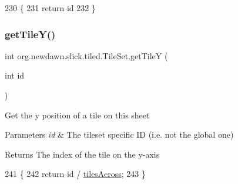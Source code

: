 \begin{DoxyCode}
230                                 \{
231         \textcolor{keywordflow}{return} \textcolor{keywordtype}{id} %
232     \}
\end{DoxyCode}
\mbox{\label{classorg_1_1newdawn_1_1slick_1_1tiled_1_1_tile_set_a09f389ff1e632d4d0d2d1424400aaeaa}} 
\subsubsection{\texorpdfstring{get\+Tile\+Y()}{getTileY()}}
{\footnotesize\ttfamily int org.\+newdawn.\+slick.\+tiled.\+Tile\+Set.\+get\+TileY (\begin{DoxyParamCaption}\item[{int}]{id }\end{DoxyParamCaption})\hspace{0.3cm}{\ttfamily [inline]}}

Get the y position of a tile on this sheet


\begin{DoxyParams}{Parameters}
{\em id} & The tileset specific ID (i.\+e. not the global one) \\
\hline
\end{DoxyParams}
\begin{DoxyReturn}{Returns}
The index of the tile on the y-\/axis 
\end{DoxyReturn}

\begin{DoxyCode}
241                                 \{
242         \textcolor{keywordflow}{return} \textcolor{keywordtype}{id} / \mbox{\hyperlink{classorg_1_1newdawn_1_1slick_1_1tiled_1_1_tile_set_ab3ffc33b31696152babe6729b445c0dd}{tilesAcross}};
243     \}
\end{DoxyCode}
\mbox{\label{classorg_1_1newdawn_1_1slick_1_1tiled_1_1_tile_set_a4cb59e26a84dd5401a841ff30fc6f34b}} 
